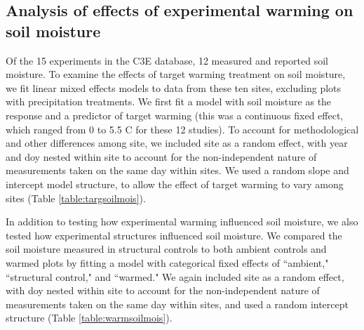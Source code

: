 \documentclass{article}
\begin{document}
\subsection* {Analysis of effects of experimental warming on soil moisture}
Of the 15 experiments in the C3E database, 12 measured and reported soil moisture. To examine the effects of target warming treatment on soil moisture, we fit linear mixed effects models to data from these ten sites, excluding plots with precipitation treatments. We first fit a model with soil moisture as the response and a predictor of target warming (this was a continuous fixed effect, which ranged from 0 to 5.5 \degree C for these 12 studies). To account for methodological and other differences among site, we included site as a random effect, with year and doy nested within site to account for the non-independent nature of measurements taken on the same day within sites.  We used a random slope and intercept model structure, to allow the effect of target warming to vary among sites (Table \ref{table:targsoilmois}). 

\par In addition to testing how experimental warming influenced soil moisture, we also tested how experimental structures influenced soil moisture. We compared the soil moisture measured in structural controls to both ambient controls and warmed plots by fitting a model with categorical fixed effects of ``ambient," ``structural control," and ``warmed."  We again included site as a random effect, with doy nested within site to account for the non-independent nature of measurements taken on the same day within sites, and used a random intercept structure (Table \ref{table:warmsoilmois}). 
\end{document}
